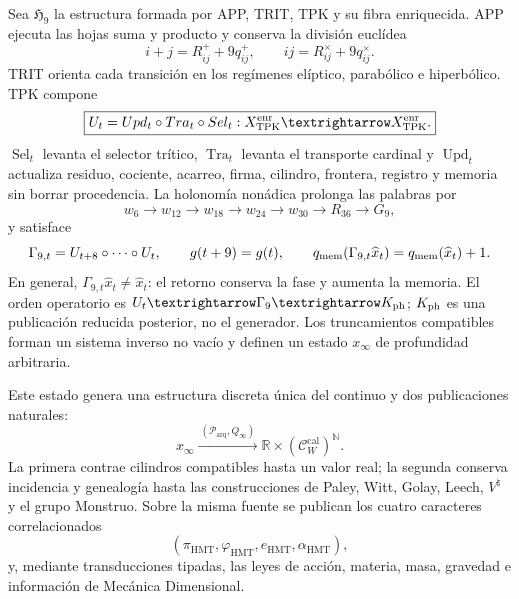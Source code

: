 \begin{theorem}
Sea \(\mathfrak H_9\) la estructura formada por APP, TRIT, TPK y su fibra
enriquecida. APP ejecuta las hojas suma y producto y conserva la división
euclídea
\[
i+j=R^+_{ij}+9q^+_{ij},
\qquad
ij=R^\times_{ij}+9q^\times_{ij}.
\]
TRIT orienta cada transición en los regímenes elíptico, parabólico e
hiperbólico. TPK compone
\[
    \boxed{\mathcal U_t
    =\operatorname{Upd}_t\circ\operatorname{Tra}_t
     \circ\operatorname{Sel}_t:
     X_{\rm TPK}^{\rm enr}\longrightarrow X_{\rm TPK}^{\rm enr}.}
\]
\(\operatorname{Sel}_t\) levanta el selector trítico,
\(\operatorname{Tra}_t\) levanta el transporte cardinal y
\(\operatorname{Upd}_t\) actualiza residuo, cociente, acarreo, firma,
cilindro, frontera, registro y memoria sin borrar procedencia.
La holonomía nonádica prolonga las palabras por
\[
w_6\longrightarrow w_{12}\longrightarrow w_{18}\longrightarrow w_{24}
\longrightarrow w_{30}\longrightarrow R_{36}\longrightarrow G_9,
\]
y satisface
\[
    \Gamma_{9,t}=\mathcal U_{t+8}\circ\cdots\circ\mathcal U_t,\qquad
    g(t+9)=g(t),
    \qquad q_{\rm mem}(\Gamma_{9,t}\widehat x_t)
    =q_{\rm mem}(\widehat x_t)+1.
\]
En general, \(\Gamma_{9,t}\widehat x_t\ne\widehat x_t\): el retorno conserva
la fase y aumenta la memoria. El orden operatorio es
\(\mathcal U_t\to\Gamma_9\to K_{\rm ph}\); \(K_{\rm ph}\) es una publicación
reducida posterior, no el generador. Los truncamientos
compatibles forman un sistema inverso no vacío y definen un estado
\(x_\infty\) de profundidad arbitraria.

Este estado genera una estructura discreta única del continuo y dos
publicaciones naturales:
\begin{equation}
x_\infty
\xrightarrow{\ (\mathcal P_{\mathrm{arq}},Q_\infty)\ }
\mathbb R\times(\mathscr C_W^{\mathrm{cal}})^{\mathbb N}.
\label{eq:frontal-doble-proyeccion}
\end{equation}
La primera contrae cilindros compatibles hasta un valor real; la segunda
conserva incidencia y genealogía hasta las construcciones de Paley, Witt,
Golay, Leech, \(V^\natural\) y el grupo Monstruo. Sobre la misma fuente se
publican los cuatro caracteres correlacionados
\[
(\pi_{\mathrm{HMT}},\varphi_{\mathrm{HMT}},
e_{\mathrm{HMT}},\alpha_{\mathrm{HMT}}),
\]
y, mediante transducciones tipadas, las leyes de acción, materia, masa,
gravedad e información de Mecánica Dimensional.
\end{theorem}

